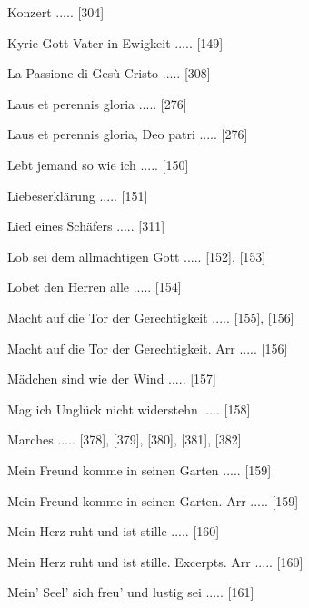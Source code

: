 \documentclass[twocolumn, 12pt]{book}
\begin{document}
\newline 
Konzert ..... [304]

\newline 
Kyrie Gott Vater in Ewigkeit ..... [149]

\newline 
La Passione di Gesù Cristo ..... [308]

\newline 
Laus et perennis gloria ..... [276]

\newline 
Laus et perennis gloria, Deo patri ..... [276]

\newline 
Lebt jemand so wie ich ..... [150]

\newline 
Liebeserklärung ..... [151]

\newline 
Lied eines Schäfers ..... [311]

\newline 
Lob sei dem allmächtigen Gott ..... [152], [153]

\newline 
Lobet den Herren alle ..... [154]

\newline 
Macht auf die Tor der Gerechtigkeit ..... [155], [156]

\newline 
Macht auf die Tor der Gerechtigkeit. Arr ..... [156]

\newline 
Mädchen sind wie der Wind ..... [157]

\newline 
Mag ich Unglück nicht widerstehn ..... [158]

\newline 
Marches ..... [378], [379], [380], [381], [382]

\newline 
Mein Freund komme in seinen Garten ..... [159]

\newline 
Mein Freund komme in seinen Garten. Arr ..... [159]

\newline 
Mein Herz ruht und ist stille ..... [160]

\newline 
Mein Herz ruht und ist stille. Excerpts. Arr ..... [160]

\newline 
Mein' Seel' sich freu' und lustig sei ..... [161]
\end{document}
